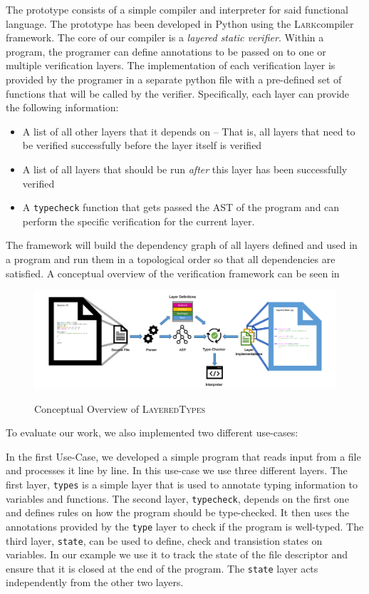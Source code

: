 \documentclass{easychair}
\newcommand{\LayeredTypes}{\textsc{LayeredTypes}}
\newcommand{\Lark}{\textsc{Lark}}
\begin{document}
The prototype consists of a simple compiler and interpreter for said functional language. The prototype has been developed in Python using the \Lark compiler framework. The core of our compiler is a \textit{layered static verifier}. Within a program, the programer can define annotations to be passed on to one or multiple verification layers. The implementation of each verification layer is provided by the programer in a separate python file with a pre-defined set of functions that will be called by the verifier. Specifically, each layer can provide the following information:

\begin{itemize}
	\item A list of all other layers that it depends on -- That is, all layers that need to be verified successfully before the layer itself is verified
	\item A list of all layers that should be run \textit{after} this layer has been successfully verified
	\item A \texttt{typecheck} function that gets passed the AST of the program and can perform the specific verification for the current layer.
\end{itemize}

The framework will build the dependency graph of all layers defined and used in a program and run them in a topological order so that all dependencies are satisfied. A conceptual overview of the verification framework can be seen in 

\begin{figure}[ht!]
	\centering
	\includegraphics[width=.8\textwidth]{framework_overview}
	\label{fig:framework_overview}
	\caption{Conceptual Overview of \LayeredTypes}
\end{figure}

To evaluate our work, we also implemented two different use-cases:

In the first Use-Case, we developed a simple program that reads input from a file and processes it line by line. In this use-case we use three different layers. The first layer, \texttt{types} is a simple layer that is used to annotate typing information to variables and functions. The second layer, \texttt{typecheck}, depends on the first one and defines rules on how the program should be type-checked. It then uses the annotations provided by the \texttt{type} layer to check if the program is well-typed. The third layer, \texttt{state}, can be used to define, check and transistion states on variables. In our example we use it to track the state of the file descriptor and ensure that it is closed at the end of the program. The \texttt{state} layer acts independently from the other two layers.
\end{document}
